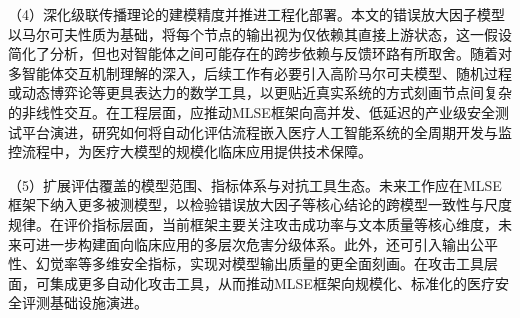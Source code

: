 （4）深化级联传播理论的建模精度并推进工程化部署。本文的错误放大因子模型以马尔可夫性质为基础，将每个节点的输出视为仅依赖其直接上游状态，这一假设简化了分析，但也对智能体之间可能存在的跨步依赖与反馈环路有所取舍。随着对多智能体交互机制理解的深入，后续工作有必要引入高阶马尔可夫模型、随机过程或动态博弈论等更具表达力的数学工具，以更贴近真实系统的方式刻画节点间复杂的非线性交互。在工程层面，应推动MLSE框架向高并发、低延迟的产业级安全测试平台演进，研究如何将自动化评估流程嵌入医疗人工智能系统的全周期开发与监控流程中，为医疗大模型的规模化临床应用提供技术保障。

（5）扩展评估覆盖的模型范围、指标体系与对抗工具生态。未来工作应在MLSE框架下纳入更多被测模型，以检验错误放大因子等核心结论的跨模型一致性与尺度规律。在评价指标层面，当前框架主要关注攻击成功率与文本质量等核心维度，未来可进一步构建面向临床应用的多层次危害分级体系。此外，还可引入输出公平性、幻觉率等多维安全指标，实现对模型输出质量的更全面刻画。在攻击工具层面，可集成更多自动化攻击工具，从而推动MLSE框架向规模化、标准化的医疗安全评测基础设施演进。
